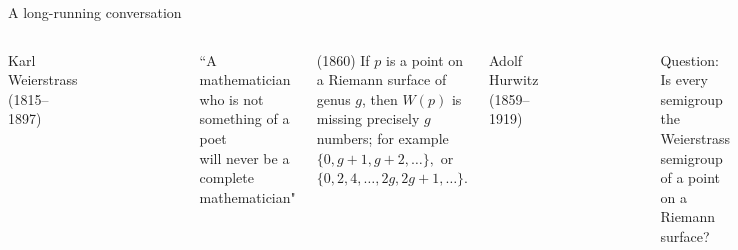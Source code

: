 \documentclass[11pt, aspectratio=43]{beamer}
\begin{document}
 \begin{frame}{A long-running conversation}
 
\begin{columns}
\alert{Karl Weierstrass} (1815--1897)
\begin{figure}
    \flushleft
    \includegraphics[width=.3\textwidth]{"KarlWeierstrassSmall.pdf"}
\end{figure}
  
\begin{small}
 ``A mathematician who is not something of a poet\\ will never be a complete mathematician" 
\end{small}
 \smallskip
 
(1860) If $p$ is a point on a Riemann surface of genus $g$,
 then $W(p)$ is missing precisely $g$ numbers; for example
 $
\{0,g+1,g+2,\dots\},
 $
 or
$
\{0,2, 4,\dots, 2g, 2g+1,\dots\}.
 $
 
\alert{Adolf Hurwitz} (1859--1919)
\begin{figure}
    \flushleft
    \includegraphics[width=.4\textwidth]{"Adolf_Hurwitz.jpg"}
\end{figure}
\begin{small}
 \begin{block}{Question:}
Is every semigroup the Weierstrass semigroup of a point
on a Riemann surface?
\end{block}
 \end{small}
\end{columns}

\end{frame}
\end{document}
